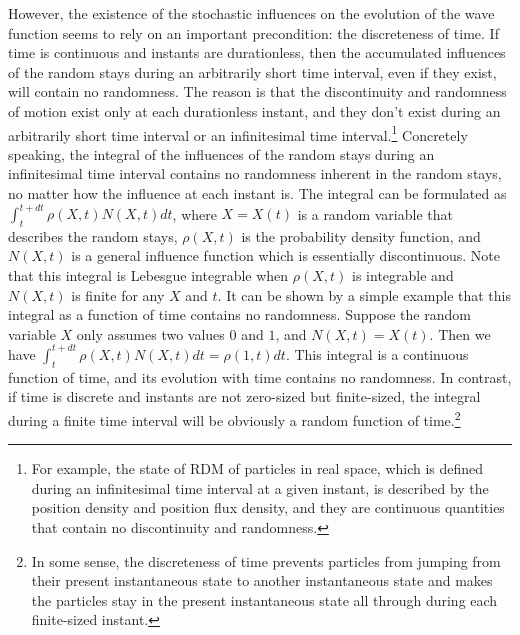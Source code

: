 However, the existence of the stochastic influences on the evolution of the wave function seems to rely on an important precondition: the discreteness of time. If time is continuous and instants are durationless, then the accumulated influences of the random stays during an arbitrarily short time interval, even if they exist, will contain no randomness. The reason is that the discontinuity and randomness of motion exist only at each durationless instant, and they don't exist during an arbitrarily short time interval or an infinitesimal time interval.\footnote{For example, the state of RDM of particles in real space, which is defined during an infinitesimal time interval at a given instant, is described by the position density and position flux density, and they are continuous quantities that contain no discontinuity and randomness.} Concretely speaking, the integral of the influences of the random stays during an infinitesimal time interval contains no randomness inherent in the random stays, no matter how the influence at each instant is. The integral can be formulated as $\int_t^{t+dt}{\rho(X,t)N(X,t)dt}$, where $X=X(t)$ is a random variable that describes the random stays, $\rho(X,t)$ is the probability density function, and $N(X,t)$ is a general influence function which is essentially discontinuous. Note that this integral is Lebesgue integrable when $\rho(X,t)$ is integrable and $N(X,t)$ is finite for any $X$ and $t$. It can be shown by a simple example that this integral as a function of time contains no randomness. Suppose the random variable $X$ only assumes two values $0$ and $1$, and $N(X,t)=X(t)$. Then we have $\int_t^{t+dt}\rho(X,t)N(X,t)dt=\rho(1,t)dt$. This integral is a continuous function of time, and its evolution with time contains no randomness. In contrast, if time is discrete and instants are not zero-sized but finite-sized, the integral during a finite time interval will  be obviously a random function of time.\footnote{In some sense, the discreteness of time prevents particles from jumping from their present instantaneous state to another instantaneous state and makes the particles stay in the present instantaneous state all through during each finite-sized instant.}


